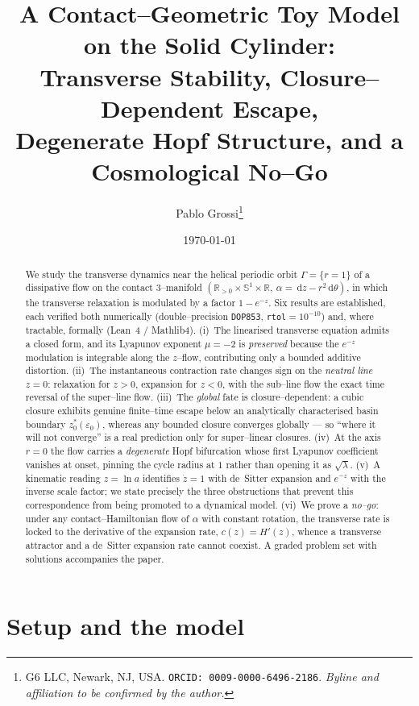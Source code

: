 \documentclass[11pt]{article}
\title{\bf A Contact--Geometric Toy Model on the Solid Cylinder:\\
Transverse Stability, Closure--Dependent Escape,\\
Degenerate Hopf Structure, and a Cosmological No--Go}
\author{Pablo Grossi\thanks{G6 LLC, Newark, NJ, USA. \texttt{ORCID: 0009-0000-6496-2186}. \emph{Byline and affiliation to be confirmed by the author.}}}
\date{\today}
\theoremstyle{plain}
\theoremstyle{definition}
\newcommand{\eps}{\varepsilon}
\newcommand{\R}{\mathbb{R}}
\newcommand{\Sph}{\mathbb{S}}
\newcommand{\dd}{\,\mathrm{d}}
\newcommand{\Gam}{\Gamma}
\begin{document}
\maketitle

\begin{abstract}
We study the transverse dynamics near the helical periodic orbit
$\Gam=\{r=1\}$ of a dissipative flow on the contact $3$--manifold
$(\R_{>0}\times\Sph^1\times\R,\ \alpha=\dd z-r^2\dd\theta)$, in which the
transverse relaxation is modulated by a factor $1-e^{-z}$. Six results are
established, each verified both numerically (double--precision \texttt{DOP853},
\texttt{rtol}$=10^{-10}$) and, where tractable, formally (Lean~4 / Mathlib4).
(i)~The linearised transverse equation admits a closed form, and its Lyapunov
exponent $\mu=-2$ is \emph{preserved} because the $e^{-z}$ modulation is
integrable along the $z$--flow, contributing only a bounded additive
distortion. (ii)~The instantaneous contraction rate changes sign on the
\emph{neutral line} $z=0$: relaxation for $z>0$, expansion for $z<0$, with the
sub--line flow the exact time reversal of the super--line flow. (iii)~The
\emph{global} fate is closure--dependent: a cubic closure exhibits genuine
finite--time escape below an analytically characterised basin boundary
$z_0^\ast(\eps_0)$, whereas any bounded closure converges globally --- so
``where it will not converge'' is a real prediction only for super--linear
closures. (iv)~At the axis $r=0$ the flow carries a \emph{degenerate} Hopf
bifurcation whose first Lyapunov coefficient vanishes at onset, pinning the
cycle radius at $1$ rather than opening it as $\sqrt{\lambda}$.
(v)~A kinematic reading $z=\ln a$ identifies $\dot z=1$ with de~Sitter
expansion and $e^{-z}$ with the inverse scale factor; we state precisely the
three obstructions that prevent this correspondence from being promoted to a
dynamical model. (vi)~We prove a \emph{no--go}: under any contact--Hamiltonian
flow of $\alpha$ with constant rotation, the transverse rate is locked to the
derivative of the expansion rate, $c(z)=H'(z)$, whence a transverse attractor
and a de~Sitter expansion rate cannot coexist. A graded problem set with
solutions accompanies the paper.
\end{abstract}

\tableofcontents

\section{Setup and the model}\label{sec:setup}
\end{document}
